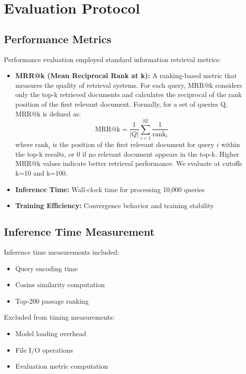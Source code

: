 \section{Evaluation Protocol}

\subsection{Performance Metrics}

Performance evaluation employed standard information retrieval metrics:

\begin{itemize}
\item \textbf{MRR@k (Mean Reciprocal Rank at k):} A ranking-based metric that measures the quality of retrieval systems. For each query, MRR@k considers only the top-k retrieved documents and calculates the reciprocal of the rank position of the first relevant document. Formally, for a set of queries Q, MRR@k is defined as:
\begin{equation}
\text{MRR@k} = \frac{1}{|Q|} \sum_{i=1}^{|Q|} \frac{1}{\text{rank}_i}
\end{equation}
where $\text{rank}_i$ is the position of the first relevant document for query $i$ within the top-k results, or 0 if no relevant document appears in the top-k. Higher MRR@k values indicate better retrieval performance. We evaluate at cutoffs k=10 and k=100.

\item \textbf{Inference Time:} Wall-clock time for processing 10,000 queries
\item \textbf{Training Efficiency:} Convergence behavior and training stability
\end{itemize}

\subsection{Inference Time Measurement}

Inference time measurements included:
\begin{itemize}
\item Query encoding time
\item Cosine similarity computation
\item Top-200 passage ranking
\end{itemize}

Excluded from timing measurements:
\begin{itemize}
\item Model loading overhead
\item File I/O operations  
\item Evaluation metric computation
\end{itemize}

